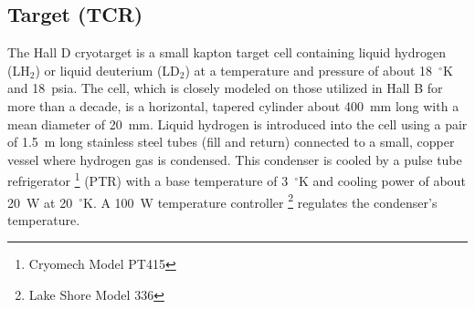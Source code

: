 %
%
%





\subsection[Target (TCR)]{Target \label{sec:target} (TCR)}
The Hall D cryotarget is a small kapton target cell containing liquid
hydrogen (LH$_2$) or liquid deuterium (LD$_2$) at a temperature and pressure
of about 18~$^\circ$K and 18~psia. The cell, which is closely modeled on those
utilized in Hall B for more than a decade, is a horizontal, tapered
cylinder about 400~mm long with a mean diameter of 20~mm.  Liquid
hydrogen is introduced into the cell using a pair of 1.5~m long
stainless steel tubes (fill and return) connected to a small, copper
vessel where hydrogen gas is condensed.  This condenser is cooled by a
pulse tube refrigerator%
\footnote{Cryomech Model PT415}
(PTR) with a base temperature of 3~$^\circ$K and
cooling power of about 20~W at 20~$^\circ$K.  
A 100~W temperature controller%
\footnote{Lake Shore Model 336}
regulates the condenser's temperature.

